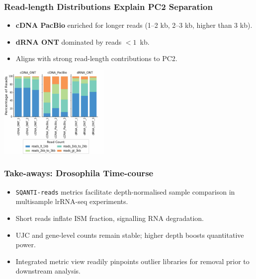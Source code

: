 \documentclass[aspectratio=169]{beamer}
\begin{document}
\begin{frame}
  \frametitle{Read-length Distributions Explain PC2 Separation}
  \begin{itemize}
    \item \textbf{cDNA PacBio} enriched for longer reads (1–2 kb, 2–3 kb, higher than 3 kb).
    \item \textbf{dRNA ONT} dominated by reads $<1$~kb.
    \item Aligns with strong read-length contributions to PC2.
  \end{itemize}
  \vspace{0.3cm}
  \centering
  \includegraphics[width=0.4\textwidth]{Genome Res_figure2_e.jpg}
\end{frame}

\begin{frame}
  \frametitle{Take-aways: Drosophila Time-course}
  \begin{itemize}
    \item \texttt{SQANTI-reads} metrics facilitate depth-normalised sample comparison in multisample lrRNA-seq experiments.
    \item Short reads inflate ISM fraction, signalling RNA degradation.
    \item UJC and gene-level counts remain stable; higher depth boosts quantitative power.
    \item Integrated metric view readily pinpoints outlier libraries for removal prior to downstream analysis.
  \end{itemize}
\end{frame}
\end{document}
